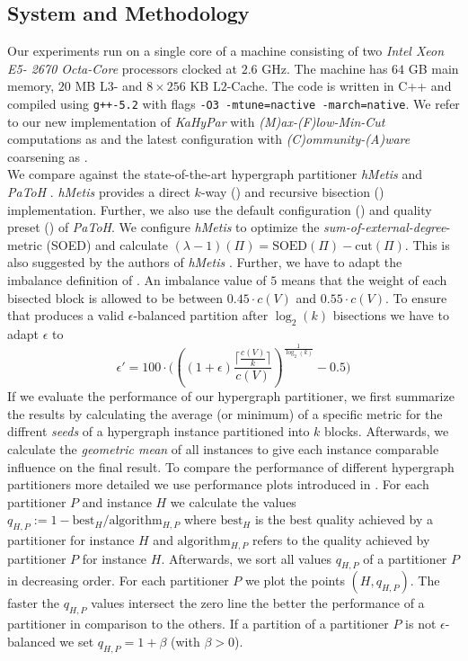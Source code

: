 \subsection{System and Methodology}
\label{sec:methodology}

Our experiments run on a single core of a machine consisting of two \emph{Intel Xeon E5-
2670 Octa-Core} processors clocked at $2.6$ GHz. The machine has $64$ GB main memory,
$20$ MB L$3$- and $8\times256$ KB L$2$-Cache. The code is written in C++ and compiled using
\lstinline{g++-5.2} with flags \lstinline{-O3 -mtune=nactive -march=native}. We refer to
our new implementation of \emph{KaHyPar} with \emph{(M)ax-(F)low-Min-Cut} computations 
as  and the latest configuration with \emph{(C)ommunity-(A)ware} coarsening as
. \\
We compare  against the state-of-the-art hypergraph partitioner \emph{hMetis} 
\cite{karypis1999multilevel,karypis2000multilevel} and \emph{PaToH} \cite{catalyurek1999hypergraph}.
\emph{hMetis} provides a direct $k$-way () and recursive bisection () implementation.
Further, we also use the default configuration () and quality preset () of
\emph{PaToH}. We configure \emph{hMetis} to optimize the \emph{sum-of-external-degree}-metric
(SOED) and calculate $(\lambda-1)(\Pi) = \text{SOED}(\Pi) - \text{cut}(\Pi)$. This is also
suggested by the authors of \emph{hMetis} \cite{karypis2000multilevel}. Further, we have
to adapt the imbalance definition of . An imbalance value of $5$ means that the weight
of each bisected block is allowed to be between $0.45 \cdot c(V)$ and $0.55 \cdot c(V)$.
To ensure that  produces a valid $\epsilon$-balanced partition after $\log_2(k)$
bisections we have to adapt $\epsilon$ to
\[\epsilon' = 100 \cdot \Bigg( \left( (1 + \epsilon) \frac{\lceil \frac{c(V)}{k} \rceil}{c(V)} \right)^{\frac{1}{\log_2(k)}} - 0.5 \Bigg)\]
If we evaluate the performance of our hypergraph partitioner,
we first summarize the results by calculating the average (or minimum) of a specific metric
for the diffrent \emph{seeds} of a hypergraph instance partitioned into $k$ blocks. 
Afterwards, we calculate the \emph{geometric mean} of 
all instances to give each instance comparable influence on the final result. 
To compare the performance of different hypergraph partitioners more detailed 
we use performance plots introduced in \cite{schlag2016k}.
For each partitioner $P$ and instance $H$ we calculate the values $q_{H,P} := 1 - \text{best$_H$}/\text{algorithm$_{H,P}$}$ 
where $\text{best$_{H}$}$ is the best quality achieved by a partitioner for instance $H$ and
$\text{algorithm$_{H,P}$}$ refers to the quality achieved by partitioner $P$ for instance
$H$. Afterwards, we sort all values $q_{H,P}$ of a partitioner $P$ in decreasing order. For each
partitioner $P$ we plot the points $(H,q_{H,P})$. The faster the $q_{H,P}$ values intersect
the zero line the better the performance of a partitioner in comparison to the others. If a partition
of a partitioner $P$ is not $\epsilon$-balanced we set $q_{H,P} = 1 + \beta$ (with $\beta > 0$).

